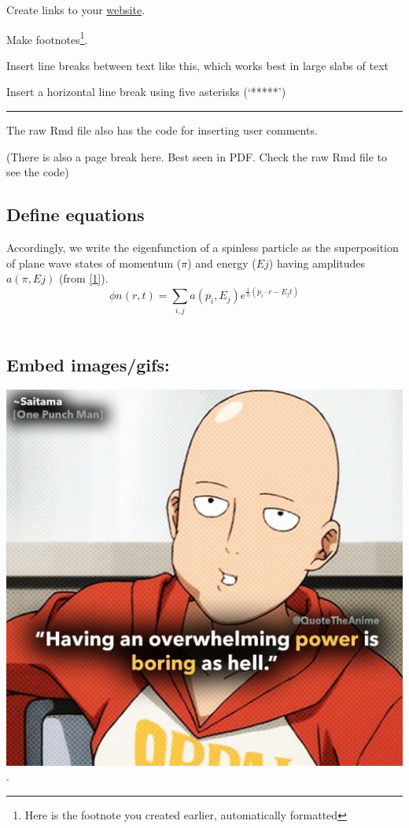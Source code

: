 \documentclass[portrait]{article}
\let\rmarkdownfootnote\footnote%
\def\footnote{\protect\rmarkdownfootnote}
\begin{document}
Create links to your \href{https://github.com/darwinanddavis}{website}.

Make footnotes\footnote{Here is the footnote you created earlier,
  automatically formatted}.

Insert line breaks between text like this, which works best in large
slabs of text

Insert a horizontal line break using five asterisks (`*****')

\begin{center}\rule{0.5\linewidth}{\linethickness}\end{center}

The raw Rmd file also has the code for inserting user comments.

(There is also a page break here. Best seen in PDF. Check the raw Rmd
file to see the code)

\newpage   

\subsection{Define equations}\label{define-equations}

Accordingly, we write the eigenfunction of a spinless particle as the
superposition of plane wave states of momentum (\(\pi\)) and energy
(\(Ej\)) having amplitudes \(a(\pi,Ej)\) (from
\href{https://arxiv.org/vc/quant-ph/papers/0607/0607001v1.pdf}{{[}1{]}}).\\
\[  
\phi n(r,t) =  
  \sum_{i, j} a(p_{i},E_{j})
  e^{
    \frac{i}
    {h}
    (p_{i} \cdot r - E_{j}t) 
}
\] ~

\subsection{Embed images/gifs:}\label{embed-imagesgifs}

\includegraphics{img/opm.jpg}.
\end{document}
